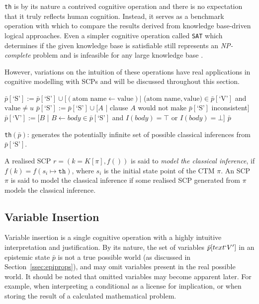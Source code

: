 \texttt{th} is by its nature a contrived cognitive operation and there is no expectation that it truly reflects human cognition. Instead, it serves as a benchmark operation with which to compare the results derived from knowledge base-driven logical approaches. Even a simpler cognitive operation called \texttt{SAT} which determines if the given knowledge base is satisfiable still represents an \textit{NP-complete}  problem and is infeasible for any large knowledge base \citep{schaefer1978complexity}.

However, variations on the intuition of these operations have real applications in cognitive modelling with SCPs and will be discussed throughout this section.

\begin{algorithm}[H] 
\SetAlgoLined
{}
{
$\bar{p}[\textrm{`S'}]:=\bar{p}[\textrm{`S'}] \cup [(\text{atom name} \leftarrow \text{value}) |$ ($\text{atom name},\text{value}) \in \bar{p}[\textrm{`V'}]$ and $\text{value} \neq u$\;
$\bar{p}[\textrm{`S'}]:=\bar{p}[\textrm{`S'}] \cup [A$ | clause $A$ would not make $\bar{p}[\textrm{`S'}]$ inconsistent$]$\;
$\bar{p}[\textrm{`V'}]:=[B$ | $B \leftarrow body \in \bar{p}[\textrm{`S'}]$ and $ I(body)=\top$ or $I(body)=\bot$]\; 
\Return $\bar{p}$
}

\caption{\texttt{th}$(\bar{p})$: generates the potentially infinite set of possible classical inferences from $\bar{p}[\textrm{`S'}]$.}
\label{cogOp:th}
\end{algorithm}

A realised SCP $r=(k=K[\pi],f())$ is said to \textit{model the classical inference}, if $f(k) = f(s_i \longmapsto \texttt{th})$, where $s_i$ is the initial state point of the CTM $\pi$. An SCP $\pi$ is said to model the classical inference if some realised SCP generated from $\pi$ models the classical inference.


\subsection{Variable Insertion}

Variable insertion is a single cognitive operation with a highly intuitive interpretation and justification. By its nature, the set of variables $\bar{p}[text{`V'}]$ in an epistemic state $\bar{p}$ is not a true possible world (as discussed in Section~\ref{ssec:epiprops}), and may omit variables present in the real possible world. It should be noted that omitted variables may become apparent later. For example, when interpreting a conditional as a license for implication, or when storing the result of a calculated mathematical problem.

